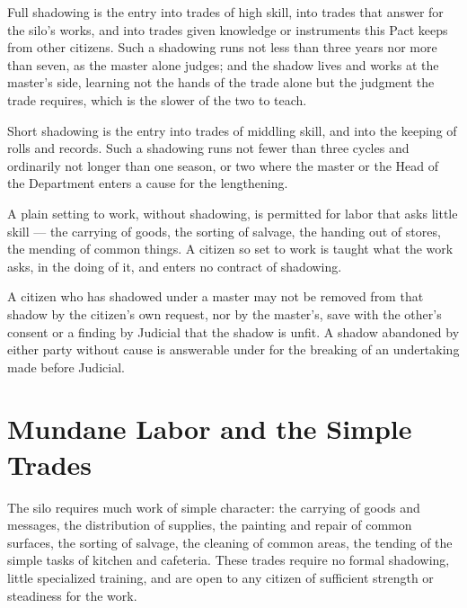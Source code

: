 \begin{clauses}
\item Full shadowing is the entry into trades of high skill, into trades that answer for the silo's works, and into trades given knowledge or instruments this Pact keeps from other citizens. Such a shadowing runs not less than three years nor more than seven, as the master alone judges; and the shadow lives and works at the master's side, learning not the hands of the trade alone but the judgment the trade requires, which is the slower of the two to teach.
\item Short shadowing is the entry into trades of middling skill, and into the keeping of rolls and records. Such a shadowing runs not fewer than three cycles and ordinarily not longer than one season, or two where the master or the Head of the Department enters a cause for the lengthening.
\item A plain setting to work, without shadowing, is permitted for labor that asks little skill --- the carrying of goods, the sorting of salvage, the handing out of stores, the mending of common things. A citizen so set to work is taught what the work asks, in the doing of it, and enters no contract of shadowing.
\item A citizen who has shadowed under a master may not be removed from that shadow by the citizen's own request, nor by the master's, save with the other's consent or a finding by Judicial that the shadow is unfit. A shadow abandoned by either party without cause is answerable under  for the breaking of an undertaking made before Judicial.
\end{clauses}

\section{Mundane Labor and the Simple Trades}
\label{sec:labor:mundane-labor-and-the-simple-trades}

The silo requires much work of simple character: the carrying of goods and messages, the distribution of supplies, the painting and repair of common surfaces, the sorting of salvage, the cleaning of common areas, the tending of the simple tasks of kitchen and cafeteria. These trades require no formal shadowing, little specialized training, and are open to any citizen of sufficient strength or steadiness for the work.

